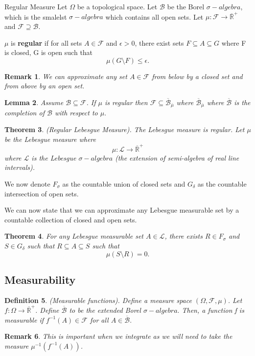 \documentclass[twoside]{article}
\newcounter{lecnum}
\newtheorem{theorem}{Theorem}[lecnum]
\newtheorem{lemma}[theorem]{Lemma}
\newtheorem{definition}[theorem]{Definition}
\newtheorem{remark}[theorem]{Remark}
\newcommand{\sigmalgebra}{\mathcal{F}}
\newcommand{\borelsigmaalgebra}{\mathcal{B}}
\newcommand{\sa}{\sigma-algebra}
\newcommand{\positiveextendedreal}{\overline{\mathbb{R}}^+}
\begin{document}
\begin{definition_exam}{Regular Measure}{} Let $\Omega$ be a topological space. Let $\mathcal{B}$ be the Borel $\sa$, which is the smalelst $\sa$ which contains all open sets. Let $\mu: \sigmalgebra \rightarrow \positiveextendedreal$ and $\sigmalgebra \supseteq \mathcal{B}$. 

$\mu$ is \textbf{regular} if for all sets $A \in \sigmalgebra$ and $\epsilon > 0$, there exist sets $F \subseteq A \subseteq G$ where F is closed, G is open such that 
$$
\mu(G \text{\textbackslash} F) \leq \epsilon.
$$
\end{definition_exam}

\begin{remark}We can approximate any set $A \in \sigmalgebra$ from below by a closed set and from above by an open set.
\end{remark}

\begin{lemma}Assume $\borelsigmaalgebra \subseteq \sigmalgebra$. If $\mu$ is regular then $\sigmalgebra \subseteq \overline{\borelsigmaalgebra}_{\overline{\mu}}$ where $\overline{\borelsigmaalgebra}_{\overline{\mu}}$ where $\overline{\borelsigmaalgebra}$ is the completion of $\borelsigmaalgebra$ with respect to $\mu.$ 
\end{lemma}

\begin{theorem}(Regular Lebesgue Measure). The Lebesgue measure is regular. Let $\mu$ be the Lebesgue measure where 
$$
\mu: \mathcal{L} \rightarrow \positiveextendedreal
$$
where $\mathcal{L}$ is the Lebesgue $\sa$ (the extension of semi-algebra of real line intervals).
\end{theorem}

We now denote $F_{\sigma}$ as the countable union of closed sets and $G_{\delta}$ as the countable intersection of open sets.

We can now state that we can approximate any Lebesgue measurable set by a countable collection of closed and open sets.
\begin{theorem}For any Lebesgue measurable set $A \in \mathcal{L}$, there exists $R \in F_{\sigma}$ and $S \in G_{\delta}$ such that $R \subseteq A \subseteq S$ such that 
$$
\mu(S \text{\textbackslash} R) = 0.
$$
\end{theorem}

\subsection{Measurability}
\begin{definition}(Measurable functions). Define a measure space $(\Omega, \sigmalgebra, \mu)$. Let $f: \Omega \rightarrow \positiveextendedreal$. Define $\overline{\borelsigmaalgebra}$ to be the extended Borel $\sa.$ Then, a function f is measurable if $f^{-1}(A) \in \sigmalgebra$ for all $A \in \overline{\borelsigmaalgebra}.$
\end{definition}
\begin{remark}This is important when we integrate as we will need to take the measure $\mu^{-1}(f^{-1}(A))$.
\end{remark}
\end{document}
